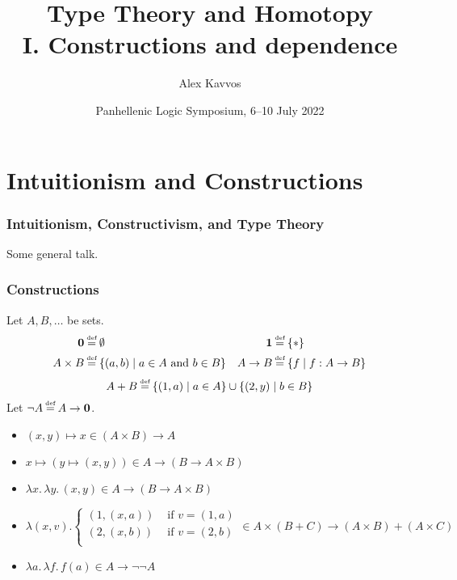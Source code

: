 \documentclass[handout]{beamer} %
\title{Type Theory and Homotopy \\ I. Constructions and dependence}
\author{
		Alex Kavvos %
}
\institute{
    University of Bristol
}
\date{Panhellenic Logic Symposium, 6--10 July 2022}
\begin{document}
\frame{\titlepage}


\section{Intuitionism and Constructions}

\begin{frame}
  \frametitle{Intuitionism, Constructivism, and Type Theory}
  
  Some general talk.
  
\end{frame}

\begin{frame}
\frametitle{Constructions}

Let $A, B, \dots$ be sets.
\begin{align*}
  \mathbf{0} &\defeq \emptyset &
  \mathbf{1} &\defeq \{ \ast \}  \\
  A \times B &\defeq \{ (a, b) \mid a \in A \text{ and } b \in B \} &
  A \to B &\defeq \{ f \mid f : A \to B \}
\end{align*}
\[
  A + B \defeq \{ (1, a) \mid a \in A \} \cup \{ (2, y) \mid b \in B \}
\]
Let $\lnot A \defeq A \to \mathbf{0}$.

\begin{example}
  \small
  \begin{itemize}
    \item $(x, y) \mapsto x \in (A \times B) \to A$
    \item $x \mapsto (y \mapsto (x, y)) \in A \to (B \to A \times B)$
    \item $\lambda x.\, \lambda y.\, (x, y) \in A \to (B \to A \times B)$
    \item $\lambda (x, v). \begin{cases}
        (1, (x, a)) & \text{ if } v = (1, a) \\
        (2, (x, b)) & \text{ if } v = (2, b) \\
    \end{cases}
    \in A \times (B + C) \to (A \times B) + (A \times C)$
    \item $\lambda a.\, \lambda f.\, f(a) \in A \to \lnot\lnot A$
  \end{itemize}
\end{example}

\end{frame}
\end{document}
